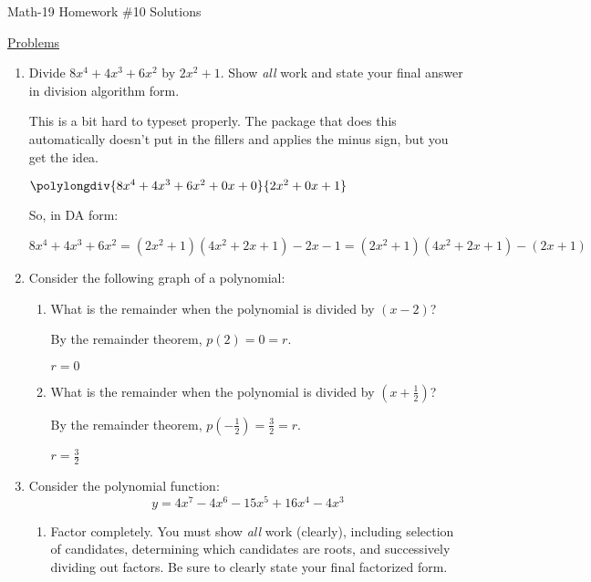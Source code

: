 \documentclass[letterpaper,12pt,fleqn]{article}
\begin{document}
\begin{center}
\Large Math-19 Homework \#10 Solutions
\end{center}

\vspace{0.5in}

\underline{Problems}

\begin{enumerate}
\item Divide $8x^4+4x^3+6x^2$ by $2x^2+1$. Show \emph{all} work and state your
  final answer in division algorithm form.

  This is a bit hard to typeset properly. The package that does this
  automatically doesn't put in the fillers and applies the minus sign, but
  you get the idea.

  $\polylongdiv{8x^4+4x^3+6x^2+0x+0}{2x^2+0x+1}$

  So, in DA form:

  $8x^4+4x^3+6x^2=(2x^2+1)(4x^2+2x+1)-2x-1=(2x^2+1)(4x^2+2x+1)-(2x+1)$

\item Consider the following graph of a polynomial:


  \begin{enumerate}
  \item What is the remainder when the polynomial is divided by $(x-2)$?

    By the remainder theorem, $p(2)=0=r$.

    $r=0$
    
  \item What is the remainder when the polynomial is divided by
    $\left(x+\frac{1}{2}\right)$?

    By the remainder theorem, $p\left(-\frac{1}{2}\right)=\frac{3}{2}=r$.

    $r=\frac{3}{2}$
    
  \end{enumerate}

\item Consider the polynomial function:
  \[y=4x^7-4x^6-15x^5+16x^4-4x^3\]
  \begin{enumerate}
  \item Factor completely. You must show \emph{all} work (clearly), including
    selection of candidates, determining which candidates are roots, and
    successively dividing out factors. Be sure to clearly state your final
    factorized form.


\end{enumerate}
\end{enumerate}
\end{document}
